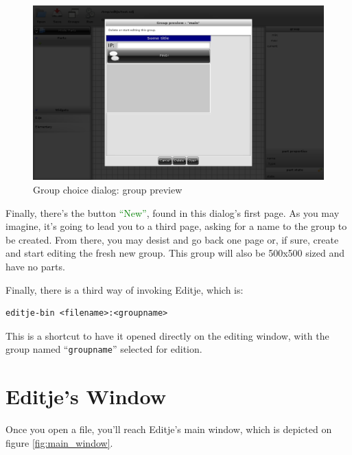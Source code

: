 \documentclass[a4paper]{profusion}
\newcommand{\GUIButton}[1]{\textcolor{green}{#1}} %
\begin{document}
\begin{figure}[h!]
  \centering
  \includegraphics[width=1.0\textwidth]{images/group_preview.png}
  \caption{Group choice dialog: group preview}
  \label{fig:group_preview}
\end{figure}

Finally, there's the button \GUIButton{``New''}, found in this
dialog's first page. As you may imagine, it's going to lead you to a
third page, asking for a name to the group to be created. From there,
you may desist and go back one page or, if sure, create and start
editing the fresh new group. This group will also be 500x500 sized and
have no parts.

Finally, there is a third way of invoking Editje, which is:

\begin{verbatim}
editje-bin <filename>:<groupname>
\end{verbatim}

This is a shortcut to have it opened directly on the editing window,
with the group named ``\texttt{groupname}'' selected for edition.

\section{Editje's Window}

Once you open a file, you'll reach Editje's main window, which is
depicted on figure \ref{fig:main_window}.
\end{document}
